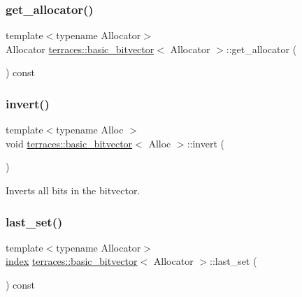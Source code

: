 \subsubsection{\texorpdfstring{get\+\_\+allocator()}{get\_allocator()}}
{\footnotesize\ttfamily template$<$typename Allocator$>$ \\
Allocator \hyperlink{classterraces_1_1basic__bitvector}{terraces\+::basic\+\_\+bitvector}$<$ Allocator $>$\+::get\+\_\+allocator (\begin{DoxyParamCaption}{ }\end{DoxyParamCaption}) const\hspace{0.3cm}{\ttfamily [inline]}}

\mbox{\label{classterraces_1_1basic__bitvector_a8a1d7d4cd0916068c73e3412347c7b18}} 
\subsubsection{\texorpdfstring{invert()}{invert()}}
{\footnotesize\ttfamily template$<$typename Alloc $>$ \\
void \hyperlink{classterraces_1_1basic__bitvector}{terraces\+::basic\+\_\+bitvector}$<$ Alloc $>$\+::invert (\begin{DoxyParamCaption}{ }\end{DoxyParamCaption})}

Inverts all bits in the bitvector. \mbox{\label{classterraces_1_1basic__bitvector_aac46a6f2e72007dc5508f4f3855e236e}} 
\subsubsection{\texorpdfstring{last\+\_\+set()}{last\_set()}}
{\footnotesize\ttfamily template$<$typename Allocator$>$ \\
\hyperlink{namespaceterraces_adbc33ccb543d1634e96d0eb02e472c77}{index} \hyperlink{classterraces_1_1basic__bitvector}{terraces\+::basic\+\_\+bitvector}$<$ Allocator $>$\+::last\+\_\+set (\begin{DoxyParamCaption}{ }\end{DoxyParamCaption}) const\hspace{0.3cm}{\ttfamily [inline]}}

